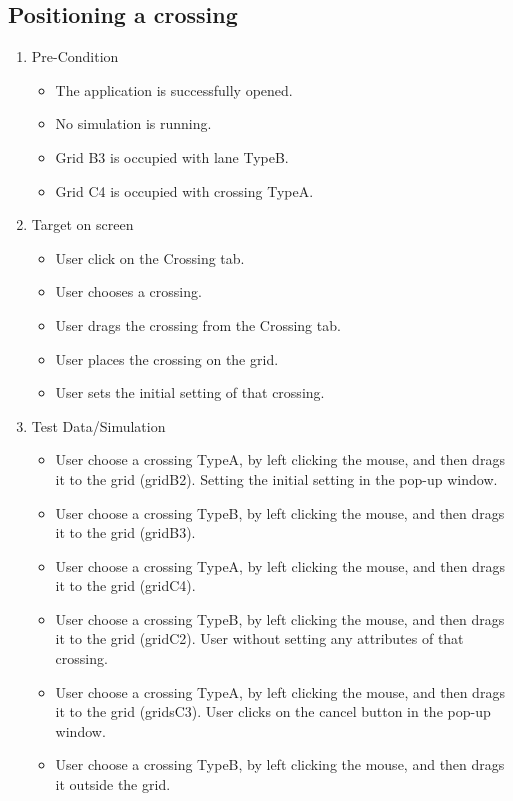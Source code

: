 \newpage

\subsection{Positioning a crossing}

\begin{enumerate}
	\item Pre-Condition
	\begin{itemize}
		\item The application is successfully opened.
		\item No simulation is running.
		\item Grid B3 is occupied with lane TypeB.
		\item Grid C4 is occupied with crossing TypeA.
	\end{itemize}
	\item Target on screen
	\begin{itemize}
		\item User click on the Crossing tab.
		\item User chooses a crossing.
		\item User drags the crossing from the Crossing tab.
		\item User places the crossing on the grid.
		\item User sets the initial setting of that crossing.
	\end{itemize}
	\item Test Data/Simulation
	\begin{itemize}
		\item User choose a crossing TypeA, by left clicking the mouse, and then drags it to the grid (gridB2). Setting the initial setting in the pop-up window.
		\item User choose a crossing TypeB, by left clicking the mouse, and then drags it to the grid (gridB3).
		\item User choose a crossing TypeA, by left clicking the mouse, and then drags it to the grid (gridC4).
		\item User choose a crossing TypeB, by left clicking the mouse, and then drags it to the grid (gridC2). User without setting any attributes of that crossing.
		\item User choose a crossing TypeA, by left clicking the mouse, and then drags it to the grid (gridsC3). User clicks on the cancel button in the pop-up window.
		\item User choose a crossing TypeB, by left clicking the mouse, and then drags it outside the grid.

\end{itemize}
\end{enumerate}
